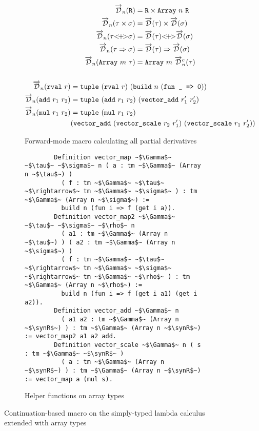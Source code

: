   \begin{figure}[H]
    \centering
    \begin{subfigure}{1\textwidth}
      \begin{gather*}
        \begin{aligned}
          \overrightarrow{\mathcal{D}}_n(\texttt{R}) &= \texttt{R} \times \texttt{Array}\ n\ \texttt{R} \\
          \overrightarrow{\mathcal{D}}_n(\tau \times \sigma) &= \overrightarrow{\mathcal{D}}(\tau) \times \overrightarrow{\mathcal{D}}(\sigma) \\
          \overrightarrow{\mathcal{D}}_n(\tau {<}\!{+}\!{>} \sigma) &= \overrightarrow{\mathcal{D}}(\tau) {<}\!{+}\!{>} \overrightarrow{\mathcal{D}}(\sigma) \\
          \overrightarrow{\mathcal{D}}_n(\tau \Rightarrow \sigma) &= \overrightarrow{\mathcal{D}}(\tau) \Rightarrow \overrightarrow{\mathcal{D}}(\sigma) \\
          \overrightarrow{\mathcal{D}}_n(\texttt{Array}\ m\ \tau) &= \texttt{Array}\ m\ \overrightarrow{\mathcal{D}}^c_n(\tau)
        \end{aligned} \\ \\
        \begin{aligned}
          \overrightarrow{\mathcal{D}}_n(\texttt{rval}\ r) &= \texttt{tuple}\ (\texttt{rval}\ r)\ (\texttt{build}\ n\ (\texttt{fun \_ => 0})) \\
          \overrightarrow{\mathcal{D}}_n(\texttt{add}\ r_1\ r_2) &= \texttt{tuple}\ (\texttt{add}\ r_1\ r_2)\ (\texttt{vector\_add}\ r_1'\ r_2') \\
          \overrightarrow{\mathcal{D}}_n(\texttt{mul}\ r_1\ r_2) &= \texttt{tuple}\ (\texttt{mul}\ r_1\ r_2)\ \\&(\texttt{vector\_add}\ (\texttt{vector\_scale}\ r_2\ r_1')\ (\texttt{vector\_scale}\ r_1\ r_2'))
        \end{aligned}
      \end{gather*}
      \caption{Forward-mode macro calculating all partial derivatives}
    \end{subfigure}
    \begin{subfigure}{1\textwidth}
      \begin{verbatim}
        Definition vector_map ~$\Gamma$~ ~$\tau$~ ~$\sigma$~ n ( a : tm ~$\Gamma$~ (Array n ~$\tau$~) )
          ( f : tm ~$\Gamma$~ ~$\tau$~ ~$\rightarrow$~ tm ~$\Gamma$~ ~$\sigma$~ ) : tm ~$\Gamma$~ (Array n ~$\sigma$~) :=
          build n (fun i => f (get i a)).
        Definition vector_map2 ~$\Gamma$~ ~$\tau$~ ~$\sigma$~ ~$\rho$~ n
          ( a1 : tm ~$\Gamma$~ (Array n ~$\tau$~) ) ( a2 : tm ~$\Gamma$~ (Array n ~$\sigma$~) )
          ( f : tm ~$\Gamma$~ ~$\tau$~ ~$\rightarrow$~ tm ~$\Gamma$~ ~$\sigma$~ ~$\rightarrow$~ tm ~$\Gamma$~ ~$\rho$~ ) : tm ~$\Gamma$~ (Array n ~$\rho$~) :=
          build n (fun i => f (get i a1) (get i a2)).
        Definition vector_add ~$\Gamma$~ n
          ( a1 a2 : tm ~$\Gamma$~ (Array n ~$\synR$~) ) : tm ~$\Gamma$~ (Array n ~$\synR$~) := vector_map2 a1 a2 add.
        Definition vector_scale ~$\Gamma$~ n ( s : tm ~$\Gamma$~ ~$\synR$~ )
          ( a : tm ~$\Gamma$~ (Array n ~$\synR$~) ) : tm ~$\Gamma$~ (Array n ~$\synR$~) := vector_map a (mul s).
      \end{verbatim}
      \caption{Helper functions on array types}
      \end{subfigure}
    \caption{Continuation-based macro on the simply-typed lambda calculus extended with array types}
    \label{fig:forward_mode_cont}
  \end{figure}

